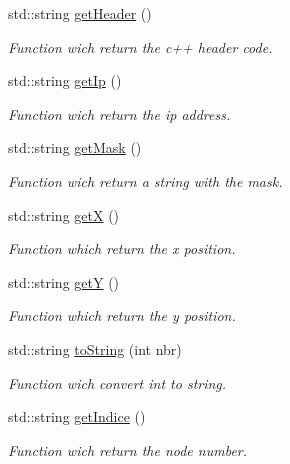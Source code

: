 \begin{CompactItemize}
std::string \hyperlink{class_equipement_c4aa745380e69d02a91f1e601430a545}{getHeader} ()
\begin{CompactList}\small\item\em Function wich return the c++ header code. \item\end{CompactList}\item 
std::string \hyperlink{class_equipement_4a0b3805228532e39dcb5f83bb2d6eac}{getIp} ()
\begin{CompactList}\small\item\em Function wich return the ip address. \item\end{CompactList}\item 
std::string \hyperlink{class_equipement_fd9a9ce18e78c3540a0cb6d633def3d3}{getMask} ()
\begin{CompactList}\small\item\em Function wich return a string with the mask. \item\end{CompactList}\item 
std::string \hyperlink{class_equipement_a5f9ea9a69609f65b8c64cda70446b02}{getX} ()
\begin{CompactList}\small\item\em Function which return the x position. \item\end{CompactList}\item 
std::string \hyperlink{class_equipement_a3b627e52bd5bfddadd665ffbf88cbd4}{getY} ()
\begin{CompactList}\small\item\em Function which return the y position. \item\end{CompactList}\item 
std::string \hyperlink{class_equipement_e6b65817f2f2d1f93669475530d849ca}{toString} (int nbr)
\begin{CompactList}\small\item\em Function wich convert int to string. \item\end{CompactList}\item 
std::string \hyperlink{class_equipement_6074ba51d63aaeebe8293a9ba9fde31f}{getIndice} ()
\begin{CompactList}\small\item\em Function wich return the node number. \item\end{CompactList}\end{CompactItemize}
